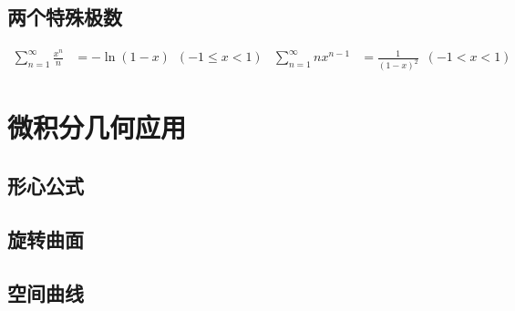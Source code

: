 ﻿\documentclass[a4paper,12pt,UTF8]{ctexart}
\begin{document}
    \subsection{两个特殊极数}
    \begin{align*}
        \sum_{n=1}^{\infty}\frac{x^{n}}{n}&=-\ln (1-x) \enspace (-1 \leq  x < 1)&  \sum_{n=1}^{\infty} nx^{n-1}&=\frac{1}{(1-x)^{2}} \enspace (-1 < x < 1)&
    \end{align*}

    \section{微积分几何应用}

    \subsection{形心公式}

    \subsection{旋转曲面}

    \subsection{空间曲线}
\end{document}
